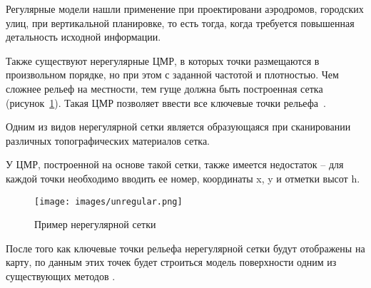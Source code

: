 Регулярные модели нашли применение при проектировани аэродромов, городских улиц, при вертикальной планировке, то есть тогда, когда требуется повышенная детальность исходной информации. 

Также существуют нерегулярные ЦМР, в которых точки размещаются в произвольном порядке, но при этом с заданной частотой и плотностью. Чем сложнее рельеф на местности, тем гуще должна быть построенная сетка (рисунок~\ref{fig:4}). Такая ЦМР позволяет ввести все ключевые точки рельефа~\cite{10}.

Одним из видов нерегулярной сетки является образующаяся при сканировании различных топографических материалов сетка.

У ЦМР, построенной на основе такой сетки, также имеется недостаток -- для каждой точки необходимо вводить ее номер, координаты x, y и отметки высот h.

\begin{figure}[h!]
    \center
    \texttt{[image: images/unregular.png]}
    \caption{Пример нерегулярной сетки}
    \label{fig:4}
\end{figure}

После того как ключевые точки рельефа нерегулярной сетки будут отображены на карту, по данным этих точек будет строиться модель поверхности одним из существующих методов \cite{11,18}. 


